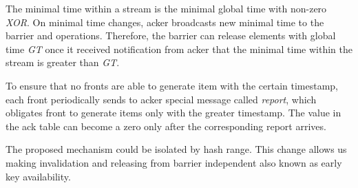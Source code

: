 The minimal time within a stream is the minimal global time with non-zero {\it XOR}. On minimal time changes, acker broadcasts new minimal time to the barrier and operations. Therefore, the barrier can release elements with global time {\it GT} once it received notification from acker that the minimal time within the stream is greater than {\it GT}.

To ensure that no fronts are able to generate item with the certain timestamp, each front periodically sends to acker special message called {\it report}, which obligates front to generate items only with the greater timestamp. The value in the ack table can become a zero only after the corresponding report arrives.

The proposed mechanism could be isolated by hash range. This change allows us making invalidation and releasing from barrier independent also known as early key availability.
